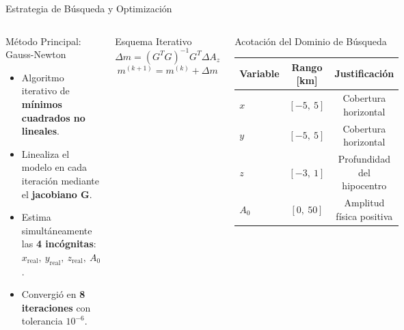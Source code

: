 
\begin{frame}{Estrategia de Búsqueda y Optimización}

    \begin{columns}[T]


        \begin{block}{Método Principal: Gauss-Newton}
            \scriptsize
            \begin{itemize}
                \item Algoritmo iterativo de \textbf{mínimos cuadrados no lineales}.
                \vspace{0.1cm}
                \item Linealiza el modelo en cada iteración mediante el \textbf{jacobiano G}.
                \vspace{0.1cm}
                \item Estima simultáneamente las \textbf{4 incógnitas}: $x_{\text{real}},\ y_{\text{real}},\ z_{\text{real}},\ A_0$.
                \vspace{0.1cm}
                \item Convergió en \textbf{8 iteraciones} con tolerancia $10^{-6}$.
            \end{itemize}
        \end{block}

        \vspace{0.2cm}

        \begin{exampleblock}{Esquema Iterativo}
            \centering
            \scriptsize
            \[
                \Delta m = (G^T G)^{-1} G^T \Delta A_z
            \]
            \[
                m^{(k+1)} = m^{(k)} + \Delta m
            \]
        \end{exampleblock}


        \begin{block}{Acotación del Dominio de Búsqueda}
            \centering
            \scriptsize
            \vspace{0.1cm}
            \begin{tabular}{@{}lcc@{}}
                \toprule
                \textbf{Variable} & \textbf{Rango [km]} & \textbf{Justificación} \\ \midrule
                $x$ & $[-5,\ 5]$ & Cobertura horizontal \\[0.15cm]
                $y$ & $[-5,\ 5]$ & Cobertura horizontal \\[0.15cm]
                $z$ & $[-3,\ 1]$ & Profundidad del hipocentro \\[0.15cm]
                $A_0$ & $[0,\ 50]$ & Amplitud física positiva \\ \bottomrule
            \end{tabular}
        \end{block}


\end{columns}
\end{frame}
